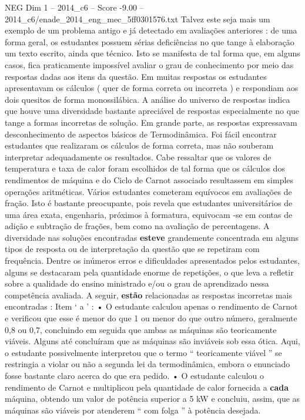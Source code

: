 \begin{textsample}{NEG Dim 1 – 2014\_c6 – Score -9.00 – 2014\_c6/enade\_2014\_eng\_mec\_5ff0301576.txt}
Talvez este seja mais um exemplo de um problema antigo e já detectado em avaliações anteriores : de uma forma geral, os estudantes possuem sérias deficiências no que tange à elaboração um texto escrito, ainda que técnico.
Isto se manifesta de tal forma que, em alguns casos, fica praticamente impossível avaliar o grau de conhecimento por meio das respostas dadas aos itens da questão.
Em muitas respostas os estudantes apresentavam os cálculos ( quer de forma correta ou incorreta ) e respondiam aos dois quesitos de forma monossilábica.
A análise do universo de respostas indica que houve uma diversidade bastante apreciável de respostas especialmente no que tange a formas incorretas de solução.
Em grande parte, as respostas expressavam desconhecimento de aspectos básicos de Termodinâmica.
Foi fácil encontrar estudantes que realizaram os cálculos de forma correta, mas não souberam interpretar adequadamente os resultados.
Cabe ressaltar que os valores de temperatura e taxa de calor foram escolhidos de tal forma que os cálculos dos rendimentos de máquina e do Ciclo de Carnot associado resultassem em simples operações aritméticas.
Vários estudantes cometeram equívocos em avaliações de fração.
Isto é bastante preocupante, pois revela que estudantes universitários de uma área exata, engenharia, próximos à formatura, equivocam -se em contas de adição e subtração de frações, bem como na avaliação de percentagens.
A diversidade nas soluções encontradas \textbf{esteve} grandemente concentrada em alguns tipos de resposta ou de interpretação da questão que se repetiram com frequência.
Dentre os inúmeros erros e dificuldades apresentados pelos estudantes, alguns se destacaram pela quantidade enorme de repetições, o que leva a refletir sobre a qualidade do ensino ministrado e/ou o grau de aprendizado nessa competência avaliada.
A seguir, \textbf{estão} relacionadas as respostas incorretas mais encontradas : Item ‘ a ’ : • O estudante calculou apenas o rendimento de Carnot e verificou que esse é menor do que 1 ou menor do que outro número, geralmente 0,8 ou 0,7, concluindo em seguida que ambas as máquinas são teoricamente viáveis.
Alguns até concluíram que as máquinas são inviáveis sob essa ótica.
Aqui, o estudante possivelmente interpretou que o termo “ teoricamente viável ” se restringia a violar ou não a segunda lei da termodinâmica, embora o enunciado fosse bastante claro acerca do que era pedido. • O estudante calculou o rendimento de Carnot e multiplicou pela quantidade de calor fornecida a \textbf{cada} máquina, obtendo um valor de potência superior a 5 kW e concluiu, assim, que as máquinas são viáveis por atenderem “ com folga ” à potência desejada.

\end{textsample}
